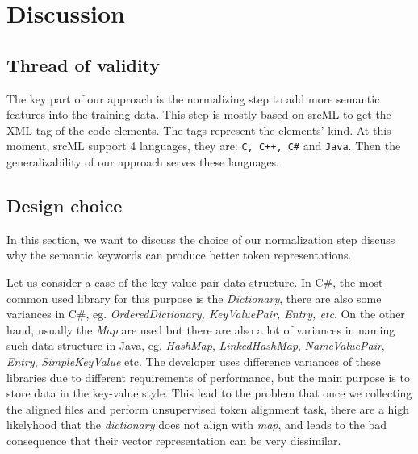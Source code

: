 \section{Discussion}
\subsection{Thread of validity}

The key part of our approach is the normalizing step to add more semantic features into the training data. This step is mostly based on srcML \cite{collard2011lightweight} to get the XML tag of the code elements. The tags represent the elements' kind. At this moment, srcML support 4 languages, they are: \texttt{C, C++, C\#} and \texttt{Java}. Then the generalizability of our approach serves these languages.

\subsection{Design choice}
\label{sub:designchoicde}

In this section, we want to discuss the choice of our normalization step discuss why the semantic keywords can produce better token representations. 

Let us consider a case of the key-value pair data structure. In C\#, the most common used library for this purpose is the \textit{Dictionary}, there are also some variances in C\#, eg. \textit{OrderedDictionary, KeyValuePair, Entry, etc}. On the other hand, usually the \textit{Map} are used but there are also a lot of variances in naming such data structure in Java, eg. \textit{HashMap}, \textit{LinkedHashMap}, \textit{NameValuePair}, \textit{Entry}, \textit{SimpleKeyValue} etc. The developer uses difference variances of these libraries due to different requirements of performance, but the main purpose is to store data in the key-value style. This lead to the problem that once we collecting the aligned files and perform unsupervised token alignment task, there are a high likelyhood that the \textit{dictionary} does not align with \textit{map}, and leads to the bad consequence that their vector representation can be very dissimilar.

